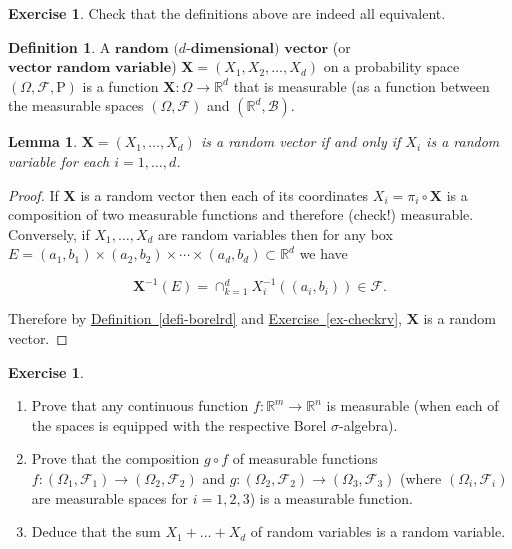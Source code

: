 \documentclass[11pt]{report}
\providecommand{\cal}{\mathcal}
\newcommand{\R}{\mathbb{R}}
\theoremstyle{plain}
\newtheorem{lem}[thm]{Lemma}
\theoremstyle{definition}
\newtheorem{defn}[thm]{Definition}
\newtheorem{xexercise}[thm]{Exercise}
\begin{document}
\begin{xexercise}
Check that the definitions above are indeed all
equivalent.
\end{xexercise}

\begin{defn}
A $\textbf{random ($d$-dimensional) vector}$ (or
$\textbf{vector random variable}$)
$\mathbf{X}=(X_1,X_2,\ldots,X_d)$ on a probability
space $(\Omega, {\cal F}, \mathrm{P})$ is a function
$\mathbf{X}:\Omega\to\R^d$ that is measurable (as a
function between the measurable spaces
$(\Omega, {\cal F})$ and $(\R^d, {\cal B})$.
\end{defn}

\begin{lem}
$\mathbf{X}=(X_1,\ldots,X_d)$ is a random vector if
and only if $X_i$ is a random variable for each
$i=1,\ldots,d$.
\end{lem}

\begin{proof}
If $\mathbf{X}$ is a random vector then each of its
coordinates $X_i = \pi_i \circ \mathbf{X}$ is a
composition of two measurable functions and therefore
(check!) measurable. Conversely, if $X_1,\ldots,X_d$
are random variables then for any box
$E=(a_1,b_1)\times (a_2,b_2)\times\cdots\times
(a_d,b_d) \subset \R^d$
we have

\[
\mathbf{X}^{-1}(E) = \cap_{k=1}^d X_i^{-1}((a_i,b_i)) \in {\cal F}.
\]

\noindent Therefore by \hyperref[defi-borelrd]{Definition~\ref*{defi-borelrd}} and \texorpdfstring{\hyperref[ex-checkrv]{Exercise~\ref*{ex-checkrv}}}{Exercise}, $\mathbf{X}$ is a random vector.
\end{proof}

\begin{xexercise}

\begin{enumerate}[label=(\roman*)]
\item Prove that any continuous function $f:\R^m\to\R^n$ is
measurable (when each of the spaces is equipped with
the respective Borel $\sigma$-algebra).

\item Prove that the composition $g\circ f$ of measurable
functions
$f:(\Omega_1, {\cal F}_1)\to (\Omega_2,{\cal F}_2)$
and
$g:(\Omega_2, {\cal F}_2)\to (\Omega_3, {\cal F}_3)$
(where $(\Omega_i, {\cal F}_i)$ are measurable spaces
for $i=1,2,3$) is a measurable function.

\item Deduce that the sum $X_1+\ldots+X_d$ of random
variables is a random variable.
\end{enumerate}

\end{xexercise}
\end{document}
